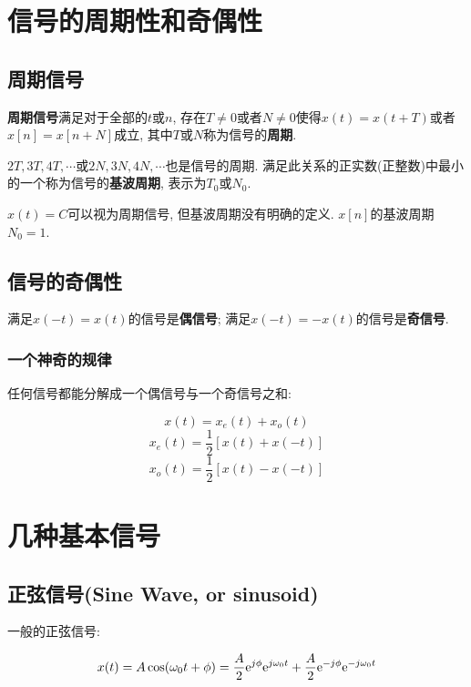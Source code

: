\section{信号的周期性和奇偶性}

    \subsection{周期信号}

        \textbf{周期信号}满足对于全部的$t$或$n$, 存在$T\neq 0$或者$N\neq 0$使得$x(t)=x(t+T)$或者$x[n]=x[n+N]$成立, 其中$T$或$N$称为信号的\textbf{周期}.

        $2T, 3T, 4T,\cdots$或$2N, 3N, 4N, \cdots$也是信号的周期. 满足此关系的正实数(正整数)中最小的一个称为信号的\textbf{基波周期}, 表示为$T_0$或$N_0$.

        $x(t)=C$可以视为周期信号, 但基波周期没有明确的定义. $x[n]$的基波周期$N_0=1$.

    \subsection{信号的奇偶性}

        满足$x(-t)=x(t)$的信号是\textbf{偶信号}; 满足$x(-t)=-x(t)$的信号是\textbf{奇信号}.

        \subsubsection{一个神奇的规律}

            任何信号都能分解成一个偶信号与一个奇信号之和:

            \[x(t)=x_e(t)+x_o(t)\]
            \[x_e(t)=\frac{1}{2}[x(t)+x(-t)]\]
            \[x_o(t)=\frac{1}{2}[x(t)-x(-t)]\]

\section{几种基本信号}

    \subsection{正弦信号(Sine Wave, or sinusoid)}

        一般的正弦信号:

        \[x(t)=A\cos(\omega_0t+\phi)=\frac{A}{2}\mathrm{e}^{j\phi}\mathrm{e}^{j\omega_0t}+\frac{A}{2}\mathrm{e}^{-j\phi}\mathrm{e}^{-j\omega_0t} \]

